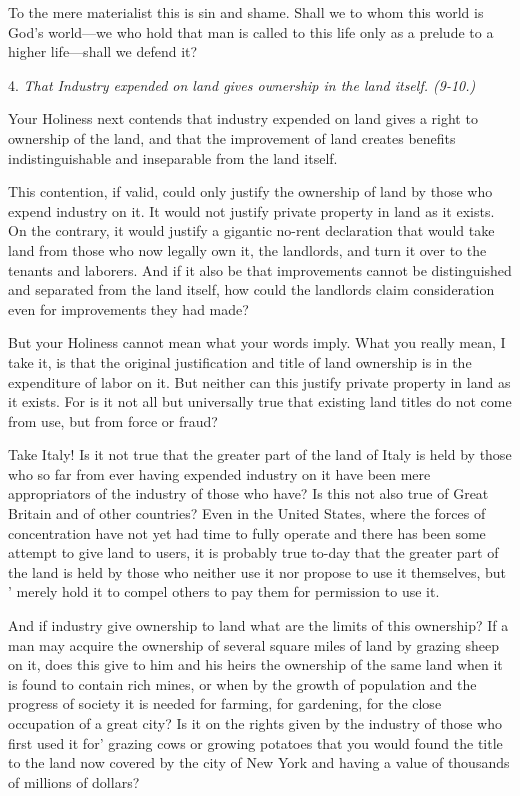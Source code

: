 \documentclass{book}
\begin{document}
To the mere materialist this is sin and shame. Shall we to whom this world is God’s world—we who hold that man is called to this life only as a prelude to a higher life—shall we defend it?

4. \emph{That Industry expended on land gives ownership in the land itself. (9-10.)}

Your Holiness next contends that industry expended on land gives a right to ownership of the land, and that the improvement of land creates benefits indistinguishable and inseparable from the land itself.

This contention, if valid, could only justify the ownership of land by those who expend industry on it. It would not justify private property in land as it exists. On the contrary, it would justify a gigantic no-rent declaration that would take land from those who now legally own it, the landlords, and turn it over to the tenants and laborers. And if it also be that improvements cannot be distinguished and separated from the land itself, how could the landlords claim consideration even for improvements they had made?

But your Holiness cannot mean what your words imply. What you really mean, I take it, is that the original justification and title of land ownership is in the expenditure of labor on it. But neither can this justify private property in land as it exists. For is it not all but universally true that existing land titles do not come from use, but from force or fraud?

Take Italy! Is it not true that the greater part of the land of Italy is held by those who so far from ever having expended industry on it have been mere appropriators of the industry of those who have? Is this not also true of Great Britain and of other countries? Even in the United States, where the forces of concentration have not yet had time to fully operate and there has been some attempt to give land to users, it is probably true to-day that the greater part of the land is held by those who neither use it nor propose to use it themselves, but ' merely hold it to compel others to pay them for permission to use it.

And if industry give ownership to land what are the limits of this ownership? If a man may acquire the ownership of several square miles of land by grazing sheep on it, does this give to him and his heirs the ownership of the same land when it is found to contain rich mines, or when by the growth of population and the progress of society it is needed for farming, for gardening, for the close occupation of a great city? Is it on the rights given by the industry of those who first used it for’ grazing cows or growing potatoes that you would found the title to the land now covered by the city of New York and having a value of thousands of millions of dollars?
\end{document}
